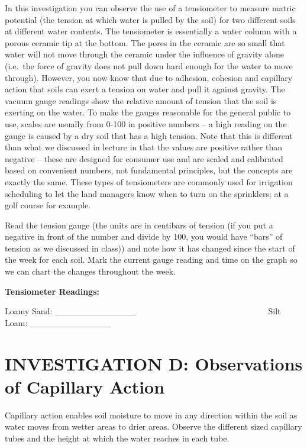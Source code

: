 \documentclass[
  letterpaper,
  twocolumn,
  portrait]{scrbook}
\begin{document}
In this investigation you can observe the use of a tensiometer to
measure matric potential (the tension at which water is pulled by the
soil) for two different soils at different water contents. The
tensiometer is essentially a water column with a porous ceramic tip at
the bottom. The pores in the ceramic are so small that water will not
move through the ceramic under the influence of gravity alone (i.e.~the
force of gravity does not pull down hard enough for the water to move
through). However, you now know that due to adhesion, cohesion and
capillary action that soils can exert a tension on water and pull it
against gravity. The vacuum gauge readings show the relative amount of
tension that the soil is exerting on the water. To make the gauges
reasonable for the general public to use, scales are usually from 0-100
in positive numbers -- a high reading on the gauge is caused by a dry
soil that has a high tension. Note that this is different than what we
discussed in lecture in that the values are positive rather than
negative -- these are designed for consumer use and are scaled and
calibrated based on convenient numbers, not fundamental principles, but
the concepts are exactly the same. These types of tensiometers are
commonly used for irrigation scheduling to let the land managers know
when to turn on the sprinklers; at a golf course for example.

Read the tension gauge (the units are in centibars of tension (if you
put a negative in front of the number and divide by 100, you would have
``bars'' of tension as we discussed in class)) and note how it has
changed since the start of the week for each soil. Mark the current
gauge reading and time on the graph so we can chart the changes
throughout the week.

\textbf{Tensiometer Readings:}

Loamy Sand:
\_\_\_\_\_\_\_\_\_\_\_\_\_~~~~~~~~~~~~~~~~~~~~~~~~~~~~~~~~Silt Loam:
\_\_\_\_\_\_\_\_\_\_\_\_\_

\hypertarget{investigation-d-observations-of-capillary-action}{%
\section{INVESTIGATION D: Observations of Capillary
Action}\label{investigation-d-observations-of-capillary-action}}

Capillary action enables soil moisture to move in any direction within
the soil as water moves from wetter areas to drier areas. Observe the
different sized capillary tubes and the height at which the water
reaches in each tube.
\end{document}
